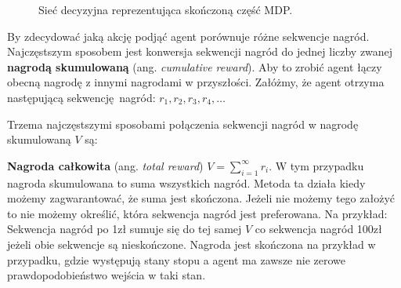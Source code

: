 \documentclass[a4paper, 12pt,twoside]{report}
\begin{document}
\begin{figure}[!htb]
\begin{center}
\caption{Sieć decyzyjna reprezentująca skończoną część MDP.}
\label{markov_decision_process}
\end{center}
\end{figure}

By zdecydować jaką akcję podjąć agent porównuje różne sekwencje nagród.
Najczęstszym sposobem jest konwersja sekwencji nagród do jednej liczby zwanej
\textbf{nagrodą skumulowaną} (ang. \textit{cumulative reward}). Aby to zrobić
agent łączy obecną nagrodę z innymi nagrodami w przyszłości. Załóżmy, że agent
otrzyma następującą sekwencję nagród: $r_1, r_2, r_3, r_4, \dots$

Trzema najczęstszymi sposobami połączenia sekwencji nagród w nagrodę
skumulowaną $V$ są:

\textbf{Nagroda całkowita} (ang. \textit{total reward}) $V =
\sum_{i=1}^{\infty} r_i$. W tym przypadku nagroda skumulowana to suma
wszystkich nagród. Metoda ta działa kiedy możemy zagwarantować, że suma jest
skończona. Jeżeli nie możemy tego założyć to nie możemy określić, która
sekwencja nagród jest preferowana. Na przykład: Sekwencja nagród po 1zł sumuje
się do tej samej $V$ co sekwencja nagród 100zł jeżeli obie sekwencje są
nieskończone. Nagroda jest skończona na przykład w przypadku, gdzie występują
stany stopu a agent ma zawsze nie zerowe prawdopodobieństwo wejścia w taki
stan.
\end{document}
